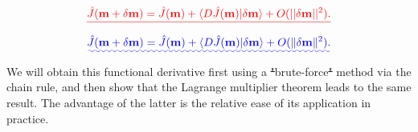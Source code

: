 \documentclass[a4paper,12pt]{paper}
\providecommand{\DIFadd}[1]{{\protect\color{blue}\uwave{#1}}} %
\providecommand{\DIFdel}[1]{{\protect\color{red}\sout{#1}}}                      %
\providecommand{\DIFaddbegin}{} %
\providecommand{\DIFaddend}{} %
\providecommand{\DIFdelbegin}{} %
\providecommand{\DIFdelend}{} %
\begin{document}
\DIFdelbegin \begin{displaymath}
\DIFdel{\hat{J}(\mathbf{m}+\delta \mathbf{m})=\hat{J}(\mathbf{m})+\langle D\hat{J}(\mathbf{m})|\delta \mathbf{m}\rangle+O(||\delta \mathbf{m}||^{2}).
}\end{displaymath}%
\DIFdelend \DIFaddbegin \begin{equation}
\DIFadd{\hat{J}(\mathbf{m}+\delta \mathbf{m})=\hat{J}(\mathbf{m})+\langle D\hat{J}(\mathbf{m})|\delta \mathbf{m}\rangle+O(\|\delta \mathbf{m}\|^{2}).
\label{eq:47}
}\end{equation}\DIFaddend 
We will obtain this functional derivative first using a \DIFdelbegin \DIFdel{"}\DIFdelend \DIFaddbegin \DIFadd{``}\DIFaddend brute-force\DIFdelbegin \DIFdel{" }\DIFdelend \DIFaddbegin \DIFadd{'' }\DIFaddend method via the chain rule, and then show that the Lagrange multiplier theorem leads to the same result. The advantage of the latter is the relative ease of its application in practice.
\end{document}
